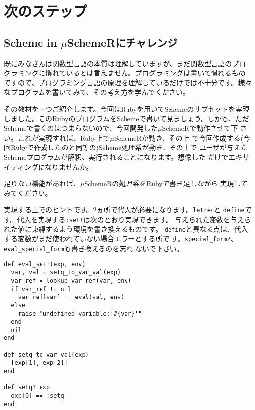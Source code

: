 \chapter{次のステップ\hspace{-3mm}}

\section{Scheme in $\mu$SchemeRにチャレンジ}
既にみなさんは関数型言語の本質は理解していますが、まだ関数型言語のプロ
グラミングに慣れているとは言えません。プログラミングは書いて慣れるもの
ですので、プログラミング言語の原理を理解しているだけでは不十分です。様々
なプログラムを書いてみて、その考え方を学んでください。

その教材を一つご紹介します。今回はRubyを用いてSchemeのサブセットを実現
しました。このRubyのプログラムをSchemeで書いて見ましょう。しかも、ただ
Schemeで書くのはつまらないので、今回開発した$\mu$SchemeRで動作させて下
さい。これが実現すれば、Ruby上で$\mu$SchemeRが動き、その上
で今回作成する(今回Rubyで作成したのと同等の)Scheme処理系が動き、その上で
ユーザが与えたSchemeプログラムが解釈、実行されることになります。想像した
だけでエキサイティングになりませんか。

足りない機能があれば、$\mu$SchemeRの処理系をRubyで書き足しながら
実現してみてください。

実現する上でのヒントです。2ヵ所で代入が必要になります。{\tt letrec}と
{\tt define}です。代入を実現する{\tt :set!}は次のとおり実現できます。
与えられた変数を与えられた値に束縛するよう環境を書き換えるものです。
{\tt define}と異なる点は、代入する変数がまだ使われていない場合エラーとする所で
す。{\tt special\_form?}、{\tt eval\_special\_form}も書き換えるのを忘れ
ないで下さい。

\begin{lstlisting}
def eval_set!(exp, env)
  var, val = setq_to_var_val(exp)
  var_ref = lookup_var_ref(var, env)
  if var_ref != nil
    var_ref[var] = _eval(val, env)
  else
    raise "undefined variable:'#{var}'"    
  end
  nil
end

def setq_to_var_val(exp)
  [exp[1], exp[2]]
end

def setq? exp
  exp[0] == :setq
end
\end{lstlisting}



